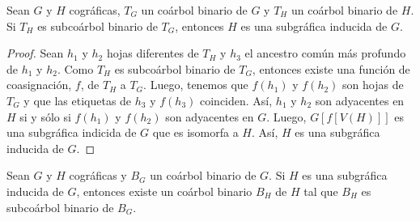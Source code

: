 \begin{lemma}
Sean $G$ y $H$ cográficas, $T_G$ un coárbol binario de $G$ y $T_H$ un coárbol binario de $H$. Si $T_H$ es subcoárbol binario de $T_G$, entonces $H$ es una subgráfica inducida de $G$.
\end{lemma}

\begin{proof}
Sean $h_1$ y $h_2$ hojas diferentes de $T_H$ y $h_3$ el ancestro común más profundo
de $h_1$ y $h_2$. Como $T_H$ es subcoárbol binario de $T_G$, entonces existe una
función de coasignación, $f$, de $T_H$ a $T_G$. Luego, tenemos que $f(h_1)$ y
$f(h_2)$ son hojas de $T_G$ y que las etiquetas de $h_3$ y $f(h_3)$ coinciden. Así,
$h_1$ y $h_2$ son adyacentes en $H$ si y sólo si $f(h_1)$ y $f(h_2)$ son adyacentes
en $G$. Luego, $G[f[V(H)]]$ es una subgráfica indicida de $G$ que es isomorfa a $H$.
Así, $H$ es una subgráfica inducida de $G$.
\end{proof}


\begin{lemma}
Sean $G$ y $H$ cográficas y $B_G$ un coárbol binario de $G$. Si $H$ es una subgráfica inducida de $G$, entonces existe un coárbol binario $B_H$ de $H$ tal que $B_H$ es subcoárbol binario de $B_G$.
\end{lemma}

